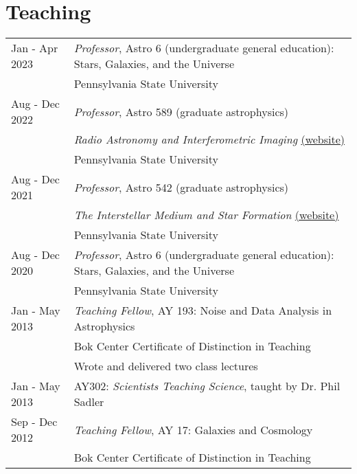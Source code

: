 \section*{Teaching}
\begin{tabular*}{\textwidth}{@{\hspace{10pt}}p{1.4in}l}
Jan - Apr 2023 & \emph{Professor}, Astro 6 (undergraduate general education): Stars, Galaxies, and the Universe\\
& Pennsylvania State University \\    
Aug - Dec 2022 & \emph{Professor}, Astro 589 (graduate astrophysics)\\
& \emph{Radio Astronomy and Interferometric Imaging} \href{https://iancze.github.io/courses/astro589/}{(website)}\\    
& Pennsylvania State University \\ 
Aug - Dec 2021 & \emph{Professor}, Astro 542 (graduate astrophysics)\\
& \emph{The Interstellar Medium and Star Formation} \href{https://iancze.github.io/courses/astro542/}{(website)}\\    
& Pennsylvania State University \\ 
Aug - Dec 2020 & \emph{Professor}, Astro 6 (undergraduate general education): Stars, Galaxies, and the Universe\\
& Pennsylvania State University \\ 
Jan - May 2013 & \emph{Teaching Fellow}, AY 193: Noise and Data Analysis in Astrophysics\\
& Bok Center Certificate of Distinction in Teaching\\
& Wrote and delivered two class lectures\\
Jan - May 2013 & AY302: \emph{Scientists Teaching Science}, taught by Dr. Phil Sadler\\
Sep - Dec 2012 & \emph{Teaching Fellow}, AY 17: Galaxies and Cosmology\\
& Bok Center Certificate of Distinction in Teaching\\
\end{tabular*}
